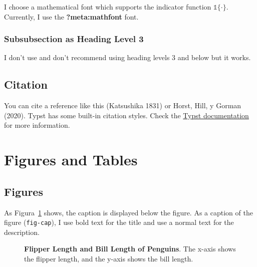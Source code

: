 \documentclass[
  12pt,
  letterpaper,
]{article}
\begin{document}
I choose a mathematical font which supports the indicator function
\(\mathbb{1}\{\cdot\}\). Currently, I use the \textbf{?meta:mathfont}
font.

\subsubsection{Subsubsection as Heading Level
3}\label{subsubsection-as-heading-level-3}

I don't use and don't recommend using heading levels 3 and below but it
works.

\subsection{Citation}\label{citation}

You can cite a reference like this (Katsushika 1831) or Horst, Hill, y
Gorman (2020). Typst has some built-in citation styles. Check the
\href{https://typst.app/docs/reference/model/bibliography/\#parameters-style}{Typst
documentation} for more information.

\section{Figures and Tables}\label{figures-and-tables}

\subsection{Figures}\label{figures}

As Figura~\ref{fig-facet} shows, the caption is displayed below the
figure. As a caption of the figure (\texttt{fig-cap}), I use bold text
for the title and use a normal text for the description.

\begin{figure}[!t]


\caption{\label{fig-facet}\textbf{Flipper Length and Bill Length of
Penguins}. The x-axis shows the flipper length, and the y-axis shows the
bill length.}

\end{figure}%
\end{document}
